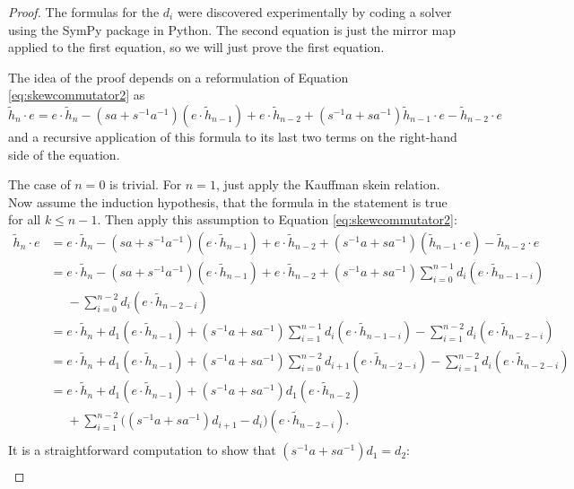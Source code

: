 \begin{proof}
The formulas for the $d_i$ were discovered experimentally by coding a solver using the SymPy package in Python. The second equation is just the mirror map applied to the first equation, so we will just prove the first equation.

The idea of the proof depends on a reformulation of Equation \eqref{eq:skewcommutator2} as
\[
\tilde{h}_n \cdot e = e \cdot \tilde{h}_n - ( s a + s^{-1} a^{-1} ) ( e \cdot \tilde{h}_{n-1} ) + e \cdot \tilde{h}_{n-2} + ( s^{-1} a + s a^{-1} ) \tilde{h}_{n-1} \cdot e - \tilde{h}_{n-2} \cdot e
\]
and a recursive application of this formula to its last two terms on the right-hand side of the equation. 

The case of $n=0$ is trivial. For $n=1$, just apply the Kauffman skein relation. Now assume the induction hypothesis, that the formula in the statement is true for all $k \leq n-1$. Then apply this assumption to Equation \eqref{eq:skewcommutator2}:
\begin{align*}
\tilde{h}_n \cdot e &= e \cdot \tilde{h}_n - ( s a + s^{-1} a^{-1} ) ( e \cdot \tilde{h}_{n-1} ) + e \cdot \tilde{h}_{n-2} + ( s^{-1} a + s a^{-1} ) ( \tilde{h}_{n-1} \cdot e ) - \tilde{h}_{n-2} \cdot e \\
&= e \cdot \tilde{h}_n - ( s a + s^{-1} a^{-1} ) ( e \cdot \tilde{h}_{n-1} ) + e \cdot \tilde{h}_{n-2} + ( s^{-1} a + s a^{-1} ) \sum_{i=0}^{n-1} d_i (e \cdot \tilde{h}_{n-1-i}) \\
&\quad \,\, - \sum_{i=0}^{n-2} d_i (e \cdot \tilde{h}_{n-2-i}) \\
&= e \cdot \tilde{h}_n + d_1 ( e \cdot \tilde{h}_{n-1} ) + ( s^{-1} a + s a^{-1} ) \sum_{i=1}^{n-1} d_i (e \cdot \tilde{h}_{n-1-i}) - \sum_{i=1}^{n-2} d_i (e \cdot \tilde{h}_{n-2-i}) \\
&= e \cdot \tilde{h}_n + d_1 ( e \cdot \tilde{h}_{n-1} ) + ( s^{-1} a + s a^{-1} ) \sum_{i=0}^{n-2} d_{i+1} (e \cdot \tilde{h}_{n-2-i}) - \sum_{i=1}^{n-2} d_i (e \cdot \tilde{h}_{n-2-i}) \\
&= e \cdot \tilde{h}_n + d_1 ( e \cdot \tilde{h}_{n-1} ) + ( s^{-1} a + s a^{-1} ) d_1 ( e \cdot \tilde{h}_{n-2} ) \\
&\quad\,\, + \sum_{i=1}^{n-2} \big( ( s^{-1} a + s a^{-1} ) d_{i+1} - d_i \big) (e \cdot \tilde{h}_{n-2-i}). \\
\end{align*}
It is a straightforward computation to show that $( s^{-1} a + s a^{-1} ) d_1 = d_2$:
\begin{align*}

\end{align*}
\end{proof}
